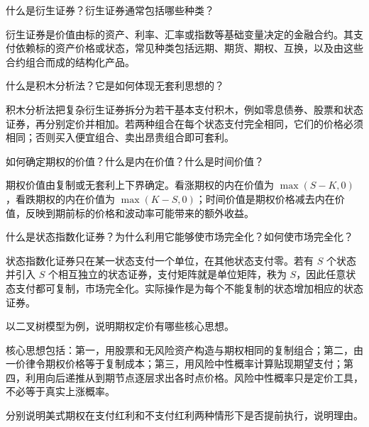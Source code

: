 
\begin{problem}
 什么是衍生证券？衍生证券通常包括哪些种类？
\end{problem}
\begin{solution}
衍生证券是价值由标的资产、利率、汇率或指数等基础变量决定的金融合约。其支付依赖标的资产价格或状态，常见种类包括远期、期货、期权、互换，以及由这些合约组合而成的结构化产品。
\end{solution}
\begin{problem}
 什么是积木分析法？它是如何体现无套利思想的？
\end{problem}
\begin{solution}
积木分析法把复杂衍生证券拆分为若干基本支付积木，例如零息债券、股票和状态证券，再分别定价并相加。若两种组合在每个状态支付完全相同，它们的价格必须相同；否则买入便宜组合、卖出昂贵组合即可套利。
\end{solution}
\begin{problem}
 如何确定期权的价值？什么是内在价值？什么是时间价值？
\end{problem}
\begin{solution}
期权价值由复制或无套利上下界确定。看涨期权的内在价值为 $\max(S-K,0)$，看跌期权的内在价值为 $\max(K-S,0)$；时间价值是期权价格减去内在价值，反映到期前标的价格和波动率可能带来的额外收益。
\end{solution}
\begin{problem}
 什么是状态指数化证券？为什么利用它能够使市场完全化？如何使市场完全化？
\end{problem}
\begin{solution}
状态指数化证券只在某一状态支付一个单位，在其他状态支付零。若有 $S$ 个状态并引入 $S$ 个相互独立的状态证券，支付矩阵就是单位矩阵，秩为 $S$，因此任意状态支付都可复制，市场完全化。实际操作是为每个不能复制的状态增加相应的状态证券。
\end{solution}
\begin{problem}
 以二叉树模型为例，说明期权定价有哪些核心思想。
\end{problem}
\begin{solution}
核心思想包括：第一，用股票和无风险资产构造与期权相同的复制组合；第二，由一价律令期权价格等于复制成本；第三，用风险中性概率计算贴现期望支付；第四，利用向后递推从到期节点逐层求出各时点价格。风险中性概率只是定价工具，不必等于真实上涨概率。
\end{solution}
\begin{problem}
 分别说明美式期权在支付红利和不支付红利两种情形下是否提前执行，说明理由。
\end{problem}
